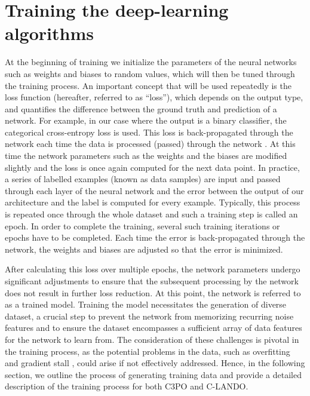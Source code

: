 \documentclass{aa}
\begin{document}
\section{Training the deep-learning algorithms}\label{sec: training ML}
At the beginning of training we initialize the parameters of the neural networks such as weights and biases to random values, which will then be tuned through the training process. %
An important concept that will be used repeatedly is the loss function (hereafter, referred to as ``loss''), which depends on the output type, and quantifies the difference between the ground truth and prediction of a network.
For example, in our case where the output is a binary classifier, the categorical cross-entropy loss is used.
This loss is back-propagated through the network each time the data is processed (passed) through the network \citep{Rojas1996}.
At this time the network parameters such as the weights and the biases are modified slightly and the loss is once again computed for the next data point.
In practice, a series of labelled examples (known as data samples) are input and passed through each layer of the neural network and the error between the output of our architecture and the label is computed for every example.
Typically, this process is repeated once through the whole dataset and such a training step is called an epoch.
In order to complete the training, several such training iterations or epochs have to be completed.
Each time the error is back-propagated through the network, the weights and biases are adjusted so that the error is minimized.

After calculating this loss over multiple epochs, the network parameters undergo significant adjustments to ensure that the subsequent processing by the network does not result in further loss reduction. At this point, the network is referred to as a trained model.
Training the model necessitates the generation of diverse dataset, a crucial step to prevent the network from memorizing recurring noise features and to ensure the dataset encompasses a sufficient array of data features for the network to learn from. The consideration of these challenges is pivotal in the training process, as the potential problems in the data, such as overfitting \citep[][]{dietterich1995overfitting} and gradient stall \citep[][]{patel2017sgd}, could arise if not effectively addressed.
Hence, in the following section, we  outline the process of generating training data and provide a detailed description of the training process for both C3PO and C-LANDO.
\end{document}
